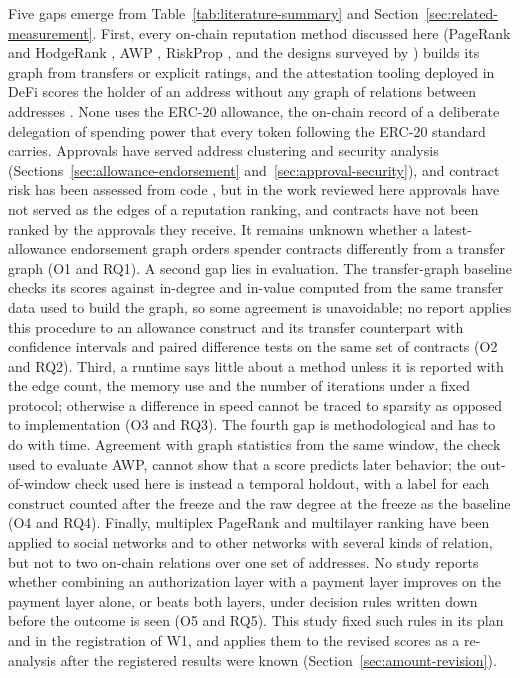 
Five gaps emerge from Table~\ref{tab:literature-summary} and Section~\ref{sec:related-measurement}. First, every on-chain reputation method discussed here (PageRank and HodgeRank \parencite{do2023hodgerank}, AWP \parencite{do2023awp}, RiskProp \parencite{lin2025riskprop}, and the designs surveyed by \textcite{bellini2020trust}) builds its graph from transfers or explicit ratings, and the attestation tooling deployed in DeFi scores the holder of an address without any graph of relations between addresses \parencite{humanpassportnddocs}. None uses the ERC-20 allowance, the on-chain record of a deliberate delegation of spending power that every token following the ERC-20 standard carries. Approvals have served address clustering and security analysis (Sections~\ref{sec:allowance-endorsement} and~\ref{sec:approval-security}), and contract risk has been assessed from code \parencite{lin2024crpwarner}, but in the work reviewed here approvals have not served as the edges of a reputation ranking, and contracts have not been ranked by the approvals they receive. It remains unknown whether a latest-allowance endorsement graph orders spender contracts differently from a transfer graph (O1 and RQ1). A second gap lies in evaluation. The transfer-graph baseline checks its scores against in-degree and in-value computed from the same transfer data used to build the graph, so some agreement is unavoidable; no report applies this procedure to an allowance construct and its transfer counterpart with confidence intervals and paired difference tests on the same set of contracts (O2 and RQ2). Third, a runtime says little about a method unless it is reported with the edge count, the memory use and the number of iterations under a fixed protocol; otherwise a difference in speed cannot be traced to sparsity as opposed to implementation (O3 and RQ3). The fourth gap is methodological and has to do with time. Agreement with graph statistics from the same window, the check used to evaluate AWP, cannot show that a score predicts later behavior; the out-of-window check used here is instead a temporal holdout, with a label for each construct counted after the freeze and the raw degree at the freeze as the baseline (O4 and RQ4). Finally, multiplex PageRank \parencite{halu2013multiplex} and multilayer ranking \parencite{dedomenico2015ranking} have been applied to social networks and to other networks with several kinds of relation, but not to two on-chain relations over one set of addresses. No study reports whether combining an authorization layer with a payment layer improves on the payment layer alone, or beats both layers, under decision rules written down before the outcome is seen (O5 and RQ5). This study fixed such rules in its plan and in the registration of W1, and applies them to the revised scores as a re-analysis after the registered results were known (Section~\ref{sec:amount-revision}).


